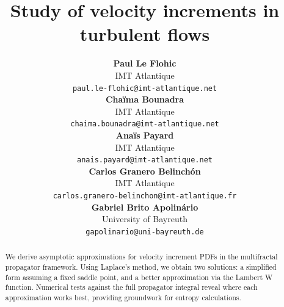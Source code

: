 \documentclass{article}
\begin{document}
\title{Study of velocity increments in turbulent flows}

\author{
    \begin{minipage}{0.32\textwidth}
        \centering
        \textbf{Paul Le Flohic} \\
        \small IMT Atlantique \\
        \scriptsize \texttt{paul.le-flohic@imt-atlantique.net}
    \end{minipage}
    \hfill
    \begin{minipage}{0.32\textwidth}
        \centering
        \textbf{Chaïma Bounadra} \\
        \small IMT Atlantique \\
        \scriptsize \texttt{chaima.bounadra@imt-atlantique.net}
    \end{minipage}
    \hfill
    \begin{minipage}{0.32\textwidth}
        \centering
        \textbf{Anaïs Payard} \\
        \small IMT Atlantique \\
        \scriptsize \texttt{anais.payard@imt-atlantique.net}
    \end{minipage}

    \vspace{0.5cm}

    \begin{minipage}{0.40\textwidth}
        \centering
        \textbf{Carlos Granero Belinchón} \\
        \small IMT Atlantique \\
        \scriptsize \texttt{carlos.granero-belinchon@imt-atlantique.fr}
    \end{minipage}
    \hspace{1.0 cm}
    \begin{minipage}{0.32\textwidth}
        \centering
        \textbf{Gabriel Brito Apolinário} \\
        \small University of Bayreuth \\
        \scriptsize \texttt{gapolinario@uni-bayreuth.de}
    \end{minipage}
}

\date{}
\maketitle

\begin{abstract}
We derive asymptotic approximations for velocity increment PDFs in the multifractal propagator framework. Using Laplace's method, we obtain two solutions: a simplified form assuming a fixed saddle point, and a better approximation via the Lambert W function. Numerical tests against the full propagator integral reveal where each approximation works best, providing groundwork for entropy calculations.
\end{abstract}
\end{document}

